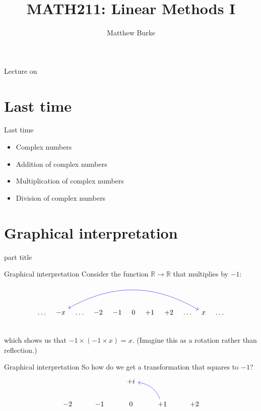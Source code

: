 \documentclass{beamer}
\title{MATH211: Linear Methods I}
\author{Matthew Burke}
\date{\lectureDate}
\newcommand{\lectureDate}{\formatdate{08}{11}{2018}}
\begin{document}
\frame{\titlepage}

\begin{frame}{Lecture on \lectureDate}
  \tableofcontents
\end{frame}

\section*{Last time}
\label{sec:Last-time}

\begin{frame}{Last time}
  \begin{itemize}
  \item Complex numbers
  \item Addition of complex numbers
  \item Multiplication of complex numbers
  \item Division of complex numbers
  \end{itemize}
\end{frame}

\section{Graphical interpretation}

\begin{frame}
\begin{beamercolorbox}[sep=12pt,center]{part title}
\insertsection\par
\end{beamercolorbox}
\end{frame}

\begin{frame}[fragile]{Graphical interpretation}
Consider the function $\mathbb{R} \rightarrow \mathbb{R}$ that multiplies by $-1$:
\begin{equation*}
\begin{tikzcd}[column sep=0.2cm]
&\dots&-x&\dots& -2 & -1  & 0 & +1& +2 & \dots&x\arrow[bend right, color = blue, leftrightarrow]{llllllll}&\dots&\\
\end{tikzcd}
\end{equation*}
which shows us that $-1\times(-1\times x) = x$.\vfill
(Imagine this as a rotation rather than reflection.)
\end{frame}

\begin{frame}[fragile]{Graphical interpretation}
So how do we get a transformation that squares to $-1$?
\begin{equation*}
\begin{tikzcd}
{} & {} & +i & {} & {}\\
-2 & -1 & 0 & +1 \arrow[bend right, color = blue]{ul} & +2\\
\end{tikzcd}
\end{equation*}
\end{frame}
\end{document}
